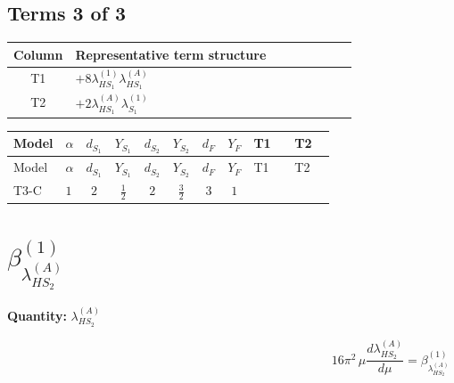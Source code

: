 \documentclass[8pt]{article}
\begin{document}
\begin{landscape}
\subsection*{Terms 3 of 3}
\begin{center}
\begin{tabular}{@{}c >{\raggedright\arraybackslash}p{0.82\linewidth}@{}}
\toprule
Column & Representative term structure \\
\midrule
T1 & \(\displaystyle +8 {\lambda_{HS_1}^{(1)}} {\lambda_{HS_1}^{(A)}}\) \\
\midrule
T2 & \(\displaystyle +2 {\lambda_{HS_1}^{(A)}} {\lambda_{S_1}^{(1)}}\) \\
\midrule
\bottomrule
\end{tabular}
\end{center}
\smallskip
\tiny
\begin{longtable}{@{}llcccccc >{\raggedright\arraybackslash}p{0.21\linewidth} >{\raggedright\arraybackslash}p{0.21\linewidth}@{}}
\toprule
Model & $\alpha$ & $d_{S_1}$ & $Y_{S_1}$ & $d_{S_2}$ & $Y_{S_2}$ & $d_F$ & $Y_F$ & T1 & T2 \\
\midrule
\endfirsthead
\toprule
Model & $\alpha$ & $d_{S_1}$ & $Y_{S_1}$ & $d_{S_2}$ & $Y_{S_2}$ & $d_F$ & $Y_F$ & T1 & T2 \\
\midrule
\endhead
T3-C & $1$ & $2$ & $\frac{1}{2}$ & $2$ & $\frac{3}{2}$ & $3$ & $1$ & \scriptsize\adjustbox{max width=\linewidth}{$\begin{gathered} +8 {\lambda_{HS_1}^{(1)}} {\lambda_{HS_1}^{(A)}}\end{gathered}$} & \scriptsize\adjustbox{max width=\linewidth}{$\begin{gathered} +2 {\lambda_{HS_1}^{(A)}} {\lambda_{S_1}^{(1)}}\end{gathered}$} \\
\midrule
\bottomrule
\end{longtable}
\clearpage
\section*{$\beta_{\lambda_{HS_2}^{(A)}}^{(1)}$}
\noindent\textbf{Quantity: }$\lambda_{HS_2}^{(A)}$\par\smallskip
\[16\pi^2\,\mu\frac{d \lambda_{HS_2}^{(A)}}{d\mu}=\beta_{\lambda_{HS_2}^{(A)}}^{(1)}\]

\end{landscape}
\end{document}
